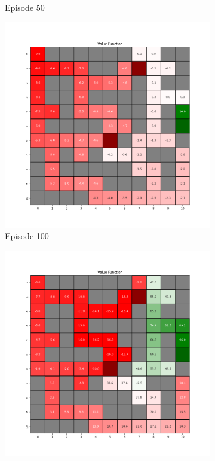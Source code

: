 \documentclass{assignment}
\begin{document}
\begin{figure}[H]
\begin{subfigure}{0.3\textwidth}
    \caption{Episode 50}
    \end{subfigure}\hfill
    \begin{subfigure}{0.3\textwidth}
        \includegraphics[width=\textwidth]{figures/value_q/epsilon_sweep/value_function_alpha_0.1_gamma_0.95_epsilon_0.8_iteration_100.png}
    \caption{Episode 100}
    \end{subfigure}
    \begin{subfigure}{0.3\textwidth}
        \includegraphics[width=\textwidth]{figures/value_q/epsilon_sweep/value_function_alpha_0.1_gamma_0.95_epsilon_0.8_iteration_1000.png}

\end{subfigure}
\end{figure}
\end{document}

